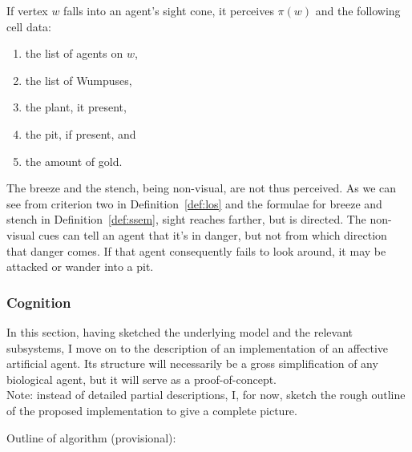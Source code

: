 If vertex $w$ falls into an agent's sight cone, it perceives $\pi(w)$ and the following cell data:

\begin{enumerate}
	\item the list of agents on $w$,
	\item the list of Wumpuses,
	\item the plant, it present,
	\item the pit, if present, and
	\item the amount of gold.
\end{enumerate}

The breeze and the stench, being non-visual, are not thus perceived. As we can see from criterion two in Definition~\ref{def:los} and the formulae for breeze and stench in Definition~\ref{def:ssem}, sight reaches farther, but is directed. The non-visual cues can tell an agent that it's in danger, but not from which direction that danger comes. If that agent consequently fails to look around, it may be attacked or wander into a pit.

\subsubsection{Cognition}

In this section, having sketched the underlying model and the relevant subsystems, I move on to the description of an implementation of an affective artificial agent. Its structure will necessarily be a gross simplification of any biological agent, but it will serve as a proof-of-concept.\\

\noindent
Note: instead of detailed partial descriptions, I, for now, sketch the rough outline of the proposed implementation to give a complete picture.

Outline of algorithm (provisional):

